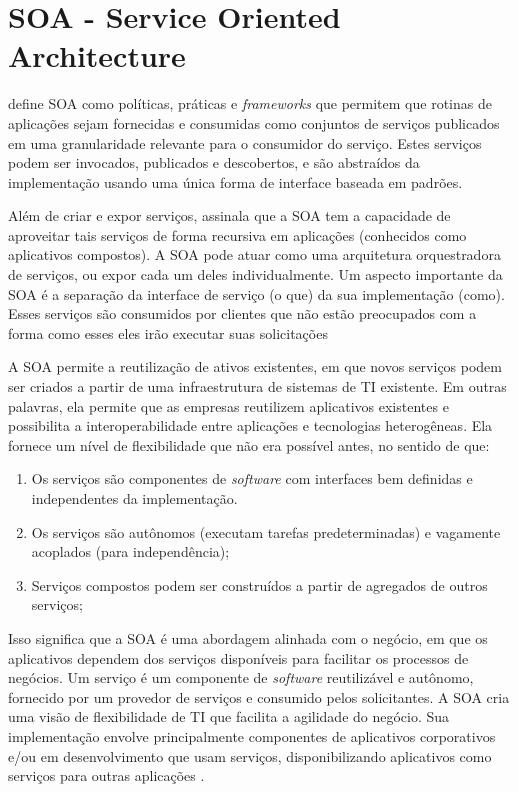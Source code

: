 \section{SOA - Service Oriented Architecture}\label{sec:soa}

 define SOA como políticas, práticas e \textit{frameworks} que permitem que rotinas de aplicações sejam fornecidas e consumidas como conjuntos de serviços publicados em uma granularidade relevante para o consumidor do serviço. Estes serviços podem ser invocados, publicados e descobertos, e são abstraídos da implementação usando uma única forma de interface baseada em padrões.

Além de criar e expor serviços,  assinala que a SOA tem a capacidade de aproveitar tais serviços de forma recursiva em aplicações (conhecidos como aplicativos compostos). A SOA pode atuar como uma arquitetura orquestradora de serviços, ou expor cada um deles individualmente. Um aspecto importante da SOA é a separação da interface de serviço (o que) da sua implementação (como). Esses serviços são consumidos por clientes que não estão preocupados com a forma como esses eles irão executar suas solicitações

 A SOA permite a reutilização de ativos existentes, em que novos serviços podem ser criados a partir de uma infraestrutura de sistemas de TI existente. Em outras palavras, ela permite que as empresas reutilizem aplicativos existentes e possibilita a interoperabilidade entre aplicações e tecnologias heterogêneas. Ela fornece um nível de flexibilidade que não era possível antes, no sentido de que:

 \begin{enumerate}[label=\alph*]
    \item Os serviços são componentes de \textit{software} com interfaces bem definidas e independentes da implementação.
    \item Os serviços são autônomos (executam tarefas predeterminadas) e vagamente acoplados (para independência);
    \item Serviços compostos podem ser construídos a partir de agregados de outros serviços;
\end{enumerate}

Isso significa que a SOA é uma abordagem alinhada com o negócio, em que os aplicativos dependem dos serviços disponíveis para facilitar os processos de negócios. Um serviço é um componente de \textit{software} reutilizável e autônomo, fornecido por um provedor de serviços e consumido pelos solicitantes. A SOA cria uma visão de flexibilidade de TI que facilita a agilidade do negócio. Sua implementação envolve principalmente componentes de aplicativos corporativos e/ou em desenvolvimento que usam serviços, disponibilizando aplicativos como serviços para outras aplicações \cite{soa-book}.

